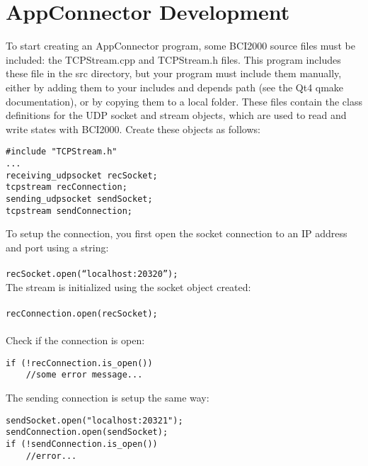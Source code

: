 \section{AppConnector Development}
\label{sec:appdev}
To start creating an AppConnector program, some BCI2000 source files must be included: the TCPStream.cpp and TCPStream.h files. This program includes these file in the src directory, but your program must include them manually, either by adding them to your includes and depends path (see the Qt4 qmake documentation), or by copying them to a local folder. These files contain the class definitions for the UDP socket and stream objects, which are used to read and write states with BCI2000. Create these objects as follows:\\

\begin{verbatim}
#include "TCPStream.h"
...
receiving_udpsocket recSocket;
tcpstream recConnection;
sending_udpsocket sendSocket;
tcpstream sendConnection;
\end{verbatim}

To setup the connection, you first open the socket connection to an IP address and port using a string:\\\\
\texttt{recSocket.open(``localhost:20320'');}\\

The stream is initialized using the socket object created:\\\\
\texttt{recConnection.open(recSocket);}\\\\

Check if the connection is open:\\

\begin{verbatim}
if (!recConnection.is_open())
    //some error message...
\end{verbatim}

The sending connection is setup the same way:

\begin{verbatim}
sendSocket.open("localhost:20321");
sendConnection.open(sendSocket);
if (!sendConnection.is_open())
    //error...
\end{verbatim}

